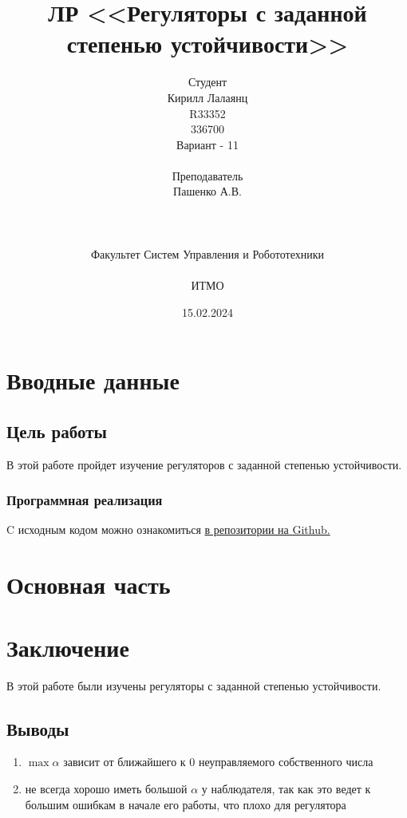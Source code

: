 \documentclass[16pt]{article}
\title{ЛР \textnumero 9 <<Регуляторы с заданной степенью устойчивости>>}
\author{
Студент \\
Кирилл Лалаянц\\
R33352\\
336700\\
Вариант - 11\\
\\
Преподаватель\\
Пашенко А.В. \\
\\
\\
\\
Факультет Систем Управления и Робототехники\\
\\
ИТМО\\
}
\date{15.02.2024}
\begin{document}
\maketitle
\newpage
\tableofcontents
\thispagestyle{empty}

\newpage
\setcounter{page}{1}
\section{Вводные данные}
\subsection{Цель работы}
В этой работе пройдет изучение регуляторов с заданной степенью устойчивости.

\subsubsection{Программная реализация}
C исходным кодом можно ознакомиться \href{https://github.com/lalayants/control-theory-itmo-2023-2024}{в репозитории на Github.}


\newpage
\section{Основная часть}

\FloatBarrier


\FloatBarrier


\FloatBarrier


\FloatBarrier

\newpage
\section{Заключение}
В этой работе были изучены регуляторы с заданной степенью устойчивости.
\subsection{Выводы}
\begin{enumerate}
   \item \(\max \alpha\) зависит от ближайшего к 0 неуправляемого собственного числа
   \item не всегда хорошо иметь большой \(\alpha\) у наблюдателя, так как это ведет к большим ошибкам в начале его работы, что плохо для регулятора
\end{enumerate}
\end{document}
